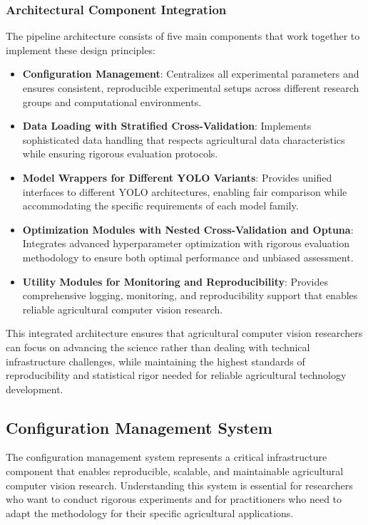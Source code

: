 \subsubsection{Architectural Component Integration}

The pipeline architecture consists of five main components that work together to implement these design principles:

\begin{itemize}
    \item \textbf{Configuration Management}: Centralizes all experimental parameters and ensures consistent, reproducible experimental setups across different research groups and computational environments.
    
    \item \textbf{Data Loading with Stratified Cross-Validation}: Implements sophisticated data handling that respects agricultural data characteristics while ensuring rigorous evaluation protocols.
    
    \item \textbf{Model Wrappers for Different YOLO Variants}: Provides unified interfaces to different YOLO architectures, enabling fair comparison while accommodating the specific requirements of each model family.
    
    \item \textbf{Optimization Modules with Nested Cross-Validation and Optuna}: Integrates advanced hyperparameter optimization with rigorous evaluation methodology to ensure both optimal performance and unbiased assessment.
    
    \item \textbf{Utility Modules for Monitoring and Reproducibility}: Provides comprehensive logging, monitoring, and reproducibility support that enables reliable agricultural computer vision research.
\end{itemize}

This integrated architecture ensures that agricultural computer vision researchers can focus on advancing the science rather than dealing with technical infrastructure challenges, while maintaining the highest standards of reproducibility and statistical rigor needed for reliable agricultural technology development.

\subsection{Configuration Management System}

The configuration management system represents a critical infrastructure component that enables reproducible, scalable, and maintainable agricultural computer vision research. Understanding this system is essential for researchers who want to conduct rigorous experiments and for practitioners who need to adapt the methodology for their specific agricultural applications.

